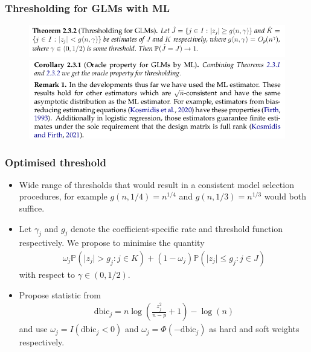 \documentclass{beamer}
\newcommand{\prob}[1]{\mathbb{P}(#1)}
\newcommand{\abs}[1]{\lvert#1\rvert}
\begin{document}
\begin{frame}
  \frametitle{Thresholding for GLMs with ML}
  \begin{figure}[h!]
    \centering
    \includegraphics[scale=0.4]{ML_thresh.png}\\
    \includegraphics[scale=0.4]{coro_remark.png}
  \end{figure}
\end{frame}

\begin{frame}
  \frametitle{Optimised threshold}
  \begin{itemize}
  \item Wide range of thresholds that would result in a consistent model selection procedures, for example $g(n,1/4) = n^{1/4}$ and $g(n,1/3) = n^{1/3}$ would both suffice.
  \item Let $\gamma_j$ and $g_j$ denote the coefficient-specific rate and threshold function respectively. We propose to minimise the quantity
    \begin{align}
      \omega_j \prob{\abs{z_j} > g_j : j \in K} + (1 - \omega_j) \prob{\abs{z_j} \leq g_j : j \in J} \label{eq:var_select_error}
    \end{align}
    with respect to $\gamma \in (0,1/2)$.
  \item Propose statistic from~\citet{derryberry:2018}
    \begin{align}
      \text{dbic}_j = n\log\left(\frac{z_j^2}{n-p} + 1\right) - \log(n) \label{eq:dbic}
    \end{align}
    and use $\omega_j = I(\text{dbic}_j < 0)$ and $\omega_j = \Phi(-\text{dbic}_j)$ as hard and soft weights respectively.
  \end{itemize}
\end{frame}
\end{document}
